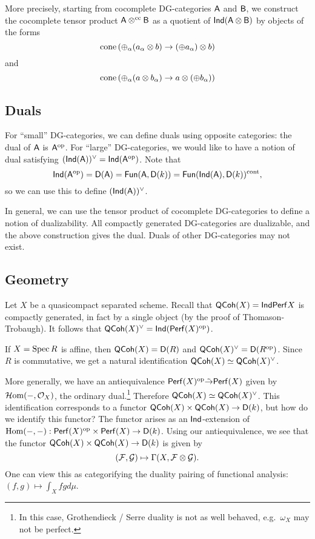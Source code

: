 \documentclass{amsart}
\begin{document}
More precisely, starting from cocomplete DG-categories $\mathsf{A}$ and $\mathsf{B}$, we construct the cocomplete tensor product $\mathsf{A} \otimes^{\mathrm{cc}} \mathsf{B}$ as a quotient of $\mathsf{Ind}(\mathsf{A} \otimes \mathsf{B})$ by objects of the forms
\[
	\operatorname{cone}\left(\oplus_{\alpha} (a_\alpha \otimes b) \to (\oplus a_\alpha) \otimes b\right)
\]
and
\[
	\operatorname{cone}\left(\oplus_{\alpha} (a \otimes b_\alpha) \to a \otimes (\oplus b_\alpha)\right)
\]

\subsection{Duals}

For ``small'' DG-categories, we can define duals using opposite categories: the dual of $\mathsf{A}$ is $\mathsf{A}^{\mathrm{op}}$.
For ``large'' DG-categories, we would like to have a notion of dual satisfying $(\mathsf{Ind}(\mathsf{A}))^\vee = \mathsf{Ind}(\mathsf{A}^{\mathrm{op}})$. 
Note that
\[
	\mathsf{Ind}(\mathsf{A}^{\mathrm{op}}) = \mathsf{D}(\mathsf{A}) = \mathsf{Fun}(\mathsf{A}, \mathsf{D}(k)) = \mathsf{Fun}(\mathsf{Ind}(\mathsf{A}), \mathsf{D}(k))^{\mathrm{cont}},
\]
so we can use this to define $(\mathsf{Ind}(\mathsf{A}))^\vee$.

In general, we can use the tensor product of cocomplete DG-categories to define a notion of dualizability.
All compactly generated DG-categories are dualizable, and the above construction gives the dual.
Duals of other DG-categories may not exist.

\subsection{Geometry}

Let $X$ be a quasicompact separated scheme.
Recall that $\mathsf{QCoh}(X) = \mathsf{Ind} \mathsf{Perf} X$ is compactly generated, in fact by a single object (by the proof of Thomason-Trobaugh).
It follows that $\mathsf{QCoh}(X)^\vee = \mathsf{Ind}(\mathsf{Perf}(X)^{\mathrm{op}})$.

\begin{ex}
	If $X = \operatorname{Spec} R$ is affine, then $\mathsf{QCoh}(X) = \mathsf{D}(R)$ and $\mathsf{QCoh}(X)^\vee = \mathsf{D}(R^{\mathrm{op}})$.
	Since $R$ is commutative, we get a natural identification $\mathsf{QCoh}(X) \simeq \mathsf{QCoh}(X)^\vee$.
\end{ex}

More generally, we have an antiequivalence $\mathsf{Perf}(X)^{\mathrm{op}} \tilde{\to} \mathsf{Perf}(X)$ given by $\mathcal{H}\mkern-3mu\operatorname{om}(-,\mathcal{O}_X)$, the ordinary dual.\footnote{In this case, Grothendieck / Serre duality is not as well behaved, e.g.\ $\omega_X$ may not be perfect.}
Therefore $\mathsf{QCoh}(X) \simeq \mathsf{QCoh}(X)^\vee$.
This identification corresponds to a functor $\mathsf{QCoh}(X) \times \mathsf{QCoh}(X) \to \mathsf{D}(k)$, but how do we identify this functor?
The functor arises as an $\mathsf{Ind}$-extension of $\operatorname{Hom}(-,-): \mathsf{Perf}(X)^{\mathrm{op}} \times \mathsf{Perf}(X) \to \mathsf{D}(k)$.
Using our antiequivalence, we see that the functor $\mathsf{QCoh}(X) \times \mathsf{QCoh}(X) \to \mathsf{D}(k)$ is given by
\[
	(\mathcal{F}, \mathcal{G}) \mapsto \Gamma(X, \mathcal{F} \otimes \mathcal{G}).
\]
One can view this as categorifying the duality pairing of functional analysis: $(f, g) \mapsto \int_X fg d\mu$.
\end{document}
